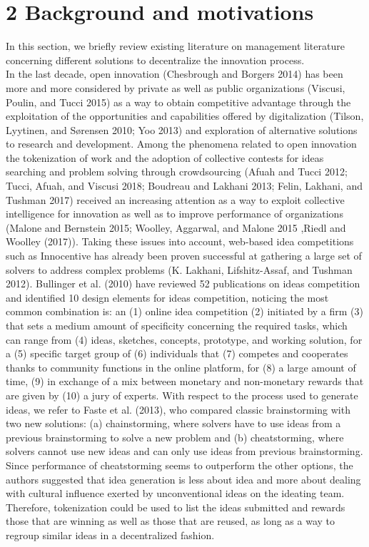 \documentclass[]{elsarticle} %
\begin{document}
\section{2 Background and motivations}\label{background-and-motivations}

In this section, we briefly review existing literature on management
literature concerning different solutions to decentralize the innovation
process.\\
In the last decade, open innovation (Chesbrough and Borgers 2014) has
been more and more considered by private as well as public organizations
(Viscusi, Poulin, and Tucci 2015) as a way to obtain competitive
advantage through the exploitation of the opportunities and capabilities
offered by digitalization (Tilson, Lyytinen, and Sørensen 2010; Yoo
2013) and exploration of alternative solutions to research and
development. Among the phenomena related to open innovation the
tokenization of work and the adoption of collective contests for ideas
searching and problem solving through crowdsourcing (Afuah and Tucci
2012; Tucci, Afuah, and Viscusi 2018; Boudreau and Lakhani 2013; Felin,
Lakhani, and Tushman 2017) received an increasing attention as a way to
exploit collective intelligence for innovation as well as to improve
performance of organizations (Malone and Bernstein 2015; Woolley,
Aggarwal, and Malone 2015 ,Riedl and Woolley (2017)). Taking these
issues into account, web-based idea competitions such as Innocentive has
already been proven successful at gathering a large set of solvers to
address complex problems (K. Lakhani, Lifshitz-Assaf, and Tushman 2012).
Bullinger et al. (2010) have reviewed 52 publications on ideas
competition and identified 10 design elements for ideas competition,
noticing the most common combination is: an (1) online idea competition
(2) initiated by a firm (3) that sets a medium amount of specificity
concerning the required tasks, which can range from (4) ideas, sketches,
concepts, prototype, and working solution, for a (5) specific target
group of (6) individuals that (7) competes and cooperates thanks to
community functions in the online platform, for (8) a large amount of
time, (9) in exchange of a mix between monetary and non-monetary rewards
that are given by (10) a jury of experts. With respect to the process
used to generate ideas, we refer to Faste et al. (2013), who compared
classic brainstorming with two new solutions: (a) chainstorming, where
solvers have to use ideas from a previous brainstorming to solve a new
problem and (b) cheatstorming, where solvers cannot use new ideas and
can only use ideas from previous brainstorming. Since performance of
cheatstorming seems to outperform the other options, the authors
suggested that idea generation is less about idea and more about dealing
with cultural influence exerted by unconventional ideas on the ideating
team. Therefore, tokenization could be used to list the ideas submitted
and rewards those that are winning as well as those that are reused, as
long as a way to regroup similar ideas in a decentralized fashion.
\end{document}

